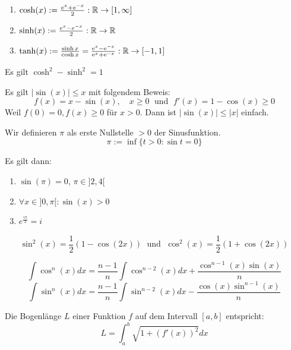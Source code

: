 
\begin{enumerate}[label = (\arabic*)]
	\item $\cosh(x) := \frac{e^x + e^{-x}}{2} : \mathbb{R} \to [1, \infty]$
	\item $\sinh(x) := \frac{e^x - e^{-x}}{2} : \mathbb{R} \to \mathbb{R}$
	\item $\tanh(x) := \frac{\sinh{x}}{\cosh{x}} = \frac{\mathrm{e}^{x}-\mathrm{e}^{-x}}{\mathrm{e}^{x}+\mathrm{e}^{-x}} : \mathbb{R} \to [-1, 1]$
\end{enumerate}

Es gilt $\cosh^2 - \sinh^2 = 1$



Es gilt $|\sin(x)| \leq x$ mit folgendem Beweis:
$$f(x) = x - \sin(x), \quad x \geq 0 \; \text{ und } \; f'(x) = 1 - \cos(x) \geq 0$$
Weil $f(0) = 0, f(x) \geq 0$ für $x > 0$. Dann ist $|\sin(x)| \leq |x|$ einfach.


\columnbreak



\begin{tcolorbox}
	\Satz Wir definieren $\pi$ als erste Nullstelle $ > 0$ der Sinusfunktion.
	$$\pi := \inf \{ t > 0 : \sin t = 0 \}$$
\end{tcolorbox}

Es gilt dann:
\begin{enumerate}[label = (\arabic*)]
	\item $\sin (\pi) = 0$, $\pi \in ]2,4[$
	\item $\forall x \in ]0, \pi[ : \sin (x) > 0$
	\item $e^{\frac{i \pi}{2}} = i$
\end{enumerate}


$$\sin^2(x) = \frac{1}{2}(1 - \cos(2x)) \; \text{ und } \; \cos^2(x) = \frac{1}{2}(1 + \cos(2x))$$

$$\int \cos^n(x)dx = \frac{n-1}{n} \int \cos^{n-2}(x)dx + \frac{\cos^{n-1}(x)\sin(x)}{n}$$
$$\int \sin^n(x)dx = \frac{n-1}{n} \int \sin^{n-2}(x)dx - \frac{\cos(x)\sin^{n-1}(x)}{n}$$


Die Bogenlänge $L$ einer Funktion $f$ auf dem Intervall $[a,b]$ entspricht:
$$L = \int_a^b \sqrt{1 + (f'(x))^2}dx$$



